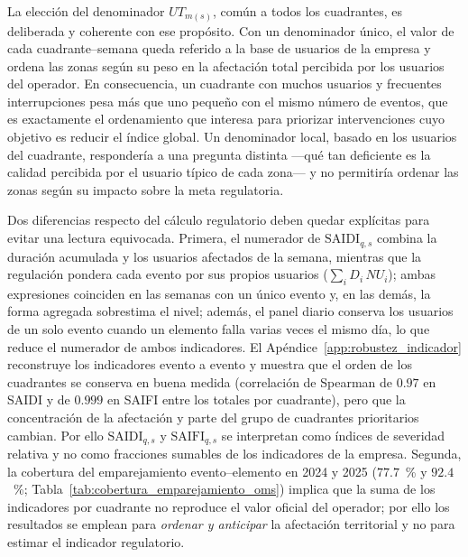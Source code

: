 La elección del denominador $UT_{m(s)}$, común a todos los cuadrantes, es deliberada y coherente con ese propósito. Con un denominador único, el valor de cada cuadrante--semana queda referido a la base de usuarios de la empresa y ordena las zonas según su peso en la afectación total percibida por los usuarios del operador. En consecuencia, un cuadrante con muchos usuarios y frecuentes interrupciones pesa más que uno pequeño con el mismo número de eventos, que es exactamente el ordenamiento que interesa para priorizar intervenciones cuyo objetivo es reducir el índice global. Un denominador local, basado en los usuarios del cuadrante, respondería a una pregunta distinta —qué tan deficiente es la calidad percibida por el usuario típico de cada zona— y no permitiría ordenar las zonas según su impacto sobre la meta regulatoria.

Dos diferencias respecto del cálculo regulatorio deben quedar explícitas para evitar una lectura equivocada. Primera, el numerador de $\mathrm{SAIDI}_{q,s}$ combina la duración acumulada y los usuarios afectados de la semana, mientras que la regulación pondera cada evento por sus propios usuarios ($\sum_i D_i\,NU_i$); ambas expresiones coinciden en las semanas con un único evento y, en las demás, la forma agregada sobrestima el nivel; además, el panel diario conserva los usuarios de un solo evento cuando un elemento falla varias veces el mismo día, lo que reduce el numerador de ambos indicadores. El Apéndice~\ref{app:robustez_indicador} reconstruye los indicadores evento a evento y muestra que el orden de los cuadrantes se conserva en buena medida (correlación de Spearman de $0{.}97$ en SAIDI y de $0{.}999$ en SAIFI entre los totales por cuadrante), pero que la concentración de la afectación y parte del grupo de cuadrantes prioritarios cambian. Por ello $\mathrm{SAIDI}_{q,s}$ y $\mathrm{SAIFI}_{q,s}$ se interpretan como índices de severidad relativa y no como fracciones sumables de los indicadores de la empresa. Segunda, la cobertura del emparejamiento evento--elemento en 2024 y 2025 ($77{.}7$~\% y $92{.}4$~\%; Tabla~\ref{tab:cobertura_emparejamiento_oms}) implica que la suma de los indicadores por cuadrante no reproduce el valor oficial del operador; por ello los resultados se emplean para \textit{ordenar y anticipar} la afectación territorial y no para estimar el indicador regulatorio.

